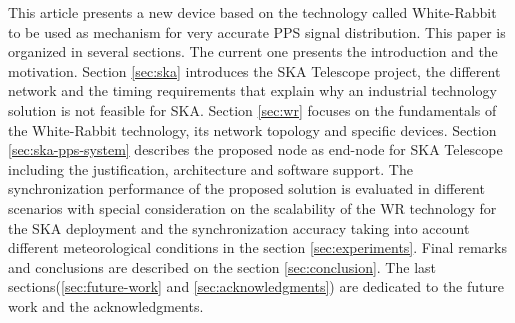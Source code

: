 This article presents a new device based on the technology called White-Rabbit 
\cite{ohwr:wr_wiki} to be used as mechanism for very accurate PPS signal 
distribution. This paper is organized in several sections. The current one 
presents the introduction and the motivation. Section \ref{sec:ska} introduces the SKA 
Telescope project, the different network and the timing requirements that 
explain why an industrial technology solution is not feasible for SKA. Section 
\ref{sec:wr} focuses on the fundamentals of the White-Rabbit technology, its network topology and specific devices. Section \ref{sec:ska-pps-system} 
describes the proposed node as end-node for SKA Telescope including the 
justification, architecture and software support. The synchronization 
performance of the proposed solution is evaluated in different scenarios with 
special consideration on the scalability of the WR technology for the SKA 
deployment and the synchronization accuracy taking into account different 
meteorological conditions in the section \ref{sec:experiments}. Final remarks and conclusions are described on the 
section \ref{sec:conclusion}. The last sections(\ref{sec:future-work} and \ref{sec:acknowledgments}) are dedicated to the future work and the 
acknowledgments.